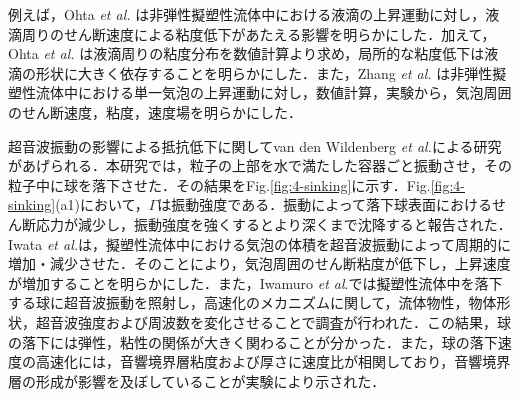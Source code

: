 例えば，Ohta {\it et al.} \cite{ref:2}は非弾性擬塑性流体中における液滴の上昇運動に対し，液滴周りのせん断速度による粘度低下があたえる影響を明らかにした．加えて，Ohta {\it et al.} \cite{ref:3}は液滴周りの粘度分布を数値計算より求め，局所的な粘度低下は液滴の形状に大きく依存することを明らかにした．また，Zhang {\it et al.} \cite{ref:4}は非弾性擬塑性流体中における単一気泡の上昇運動に対し，数値計算，実験から，気泡周囲のせん断速度，粘度，速度場を明らかにした．

超音波振動の影響による抵抗低下に関してvan den Wildenberg {\it et al.}\cite{ref:6}による研究があげられる．本研究では，粒子の上部を水で満たした容器ごと振動させ，その粒子中に球を落下させた．その結果をFig.\ref{fig:4-sinking}に示す．Fig.\ref{fig:4-sinking}(a1)において，$\Gamma$は振動強度である．振動によって落下球表面におけるせん断応力が減少し，振動強度を強くするとより深くまで沈降すると報告された．Iwata {\it et al.}\cite{ref:5}は，擬塑性流体中における気泡の体積を超音波振動によって周期的に増加・減少させた．そのことにより，気泡周囲のせん断粘度が低下し，上昇速度が増加することを明らかにした．また，Iwamuro \textit{et al}.\cite{ref:8}では擬塑性流体中を落下する球に超音波振動を照射し，高速化のメカニズムに関して，流体物性，物体形状，超音波強度および周波数を変化させることで調査が行われた．この結果，球の落下には弾性，粘性の関係が大きく関わることが分かった．また，球の落下速度の高速化には，音響境界層粘度および厚さに速度比が相関しており，音響境界層の形成が影響を及ぼしていることが実験により示された．

